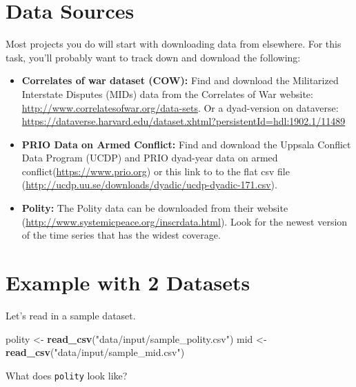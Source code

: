 \documentclass[]{book}
\newenvironment{Shaded}{\begin{snugshade}}{\end{snugshade}}
\newcommand{\KeywordTok}[1]{\textcolor[rgb]{0.13,0.29,0.53}{\textbf{#1}}}
\newcommand{\NormalTok}[1]{#1}
\newcommand{\OperatorTok}[1]{\textcolor[rgb]{0.81,0.36,0.00}{\textbf{#1}}}
\newcommand{\StringTok}[1]{\textcolor[rgb]{0.31,0.60,0.02}{#1}}
\providecommand{\tightlist}{%
  \setlength{\itemsep}{0pt}\setlength{\parskip}{0pt}}
\theoremstyle{definition}
\theoremstyle{definition}
\theoremstyle{definition}
\theoremstyle{remark}
\begin{document}
\begin{Shaded}
\begin{Highlighting}[]
\begin{Shaded}
\begin{Highlighting}[]
\begin{Shaded}
\begin{Highlighting}[]
\hypertarget{data-sources}{%
\section{Data Sources}\label{data-sources}}

Most projects you do will start with downloading data from elsewhere. For this task, you'll probably want to track down and download the following:

\begin{itemize}
\tightlist
\item
  \textbf{Correlates of war dataset (COW):} Find and download the Militarized Interstate Disputes (MIDs) data from the Correlates of War website: \url{http://www.correlatesofwar.org/data-sets}. Or a dyad-version on dataverse: \url{https://dataverse.harvard.edu/dataset.xhtml?persistentId=hdl:1902.1/11489}
\item
  \textbf{PRIO Data on Armed Conflict:} Find and download the Uppsala Conflict Data Program (UCDP) and PRIO dyad-year data on armed conflict(\url{https://www.prio.org}) or this link to to the flat csv file (\url{http://ucdp.uu.se/downloads/dyadic/ucdp-dyadic-171.csv}).
\item
  \textbf{Polity:} The Polity data can be downloaded from their website (\url{http://www.systemicpeace.org/inscrdata.html}). Look for the newest version of the time series that has the widest coverage.
\end{itemize}

\hypertarget{example-with-2-datasets}{%
\section{Example with 2 Datasets}\label{example-with-2-datasets}}

Let's read in a sample dataset.

\begin{Shaded}
\begin{Highlighting}[]
\NormalTok{polity <-}\StringTok{ }\KeywordTok{read_csv}\NormalTok{(}\StringTok{"data/input/sample_polity.csv"}\NormalTok{)}
\NormalTok{mid <-}\StringTok{ }\KeywordTok{read_csv}\NormalTok{(}\StringTok{"data/input/sample_mid.csv"}\NormalTok{)}
\end{Highlighting}
\end{Shaded}

What does \texttt{polity} look like?

\begin{Shaded}
\end{Shaded}


\end{Highlighting}
\end{Shaded}
\end{Highlighting}
\end{Shaded}
\end{Highlighting}
\end{Shaded}
\end{document}
